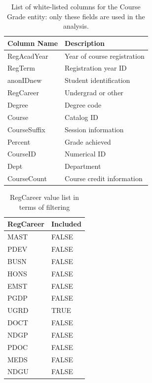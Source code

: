 \begin{table}[]
  \centering
  \caption{List of white-listed columns for the Course Grade entity: only these fields are used in the analysis.}
  \label{Grades Columns}
  \begin{tabular}{ll}
    Column Name  & Description                 \\ \hline
    RegAcadYear  & Year of course registration \\
    RegTerm      & Registration year ID        \\
    anonIDnew    & Student identification      \\
    RegCareer    & Undergrad or other          \\
    Degree       & Degree code                 \\
    Course       & Catalog ID                  \\
    CourseSuffix & Session information         \\
    Percent      & Grade achieved              \\
    CourseID     & Numerical ID                \\
    Dept         & Department                  \\
    CourseCount  & Course credit information   \\ \hline
  \end{tabular}
\end{table}

\begin{table}[]
  \centering
  \caption{RegCareer value list in terms of filtering}
  \label{RegCareerFilter}
  \begin{tabular}{ll}
    RegCareer & Included \\ \hline
    MAST      & FALSE    \\
    PDEV      & FALSE    \\
    BUSN      & FALSE    \\
    HONS      & FALSE    \\
    EMST      & FALSE    \\
    PGDP      & FALSE    \\
    UGRD      & TRUE     \\
    DOCT      & FALSE    \\
    NDGP      & FALSE    \\
    PDOC      & FALSE    \\
    MEDS      & FALSE    \\
    NDGU      & FALSE    \\ \hline
  \end{tabular}
\end{table}

